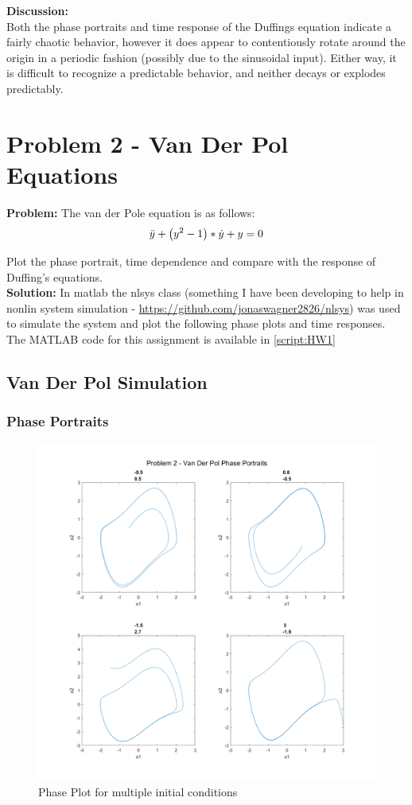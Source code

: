 \documentclass[letter]{article}
\begin{document}
\textbf{Discussion:}\\

Both the phase portraits and time response of the Duffings equation indicate a fairly chaotic behavior, however it does appear to contentiously rotate around the origin in a periodic fashion (possibly due to the sinusoidal input). Either way, it is difficult to recognize a predictable behavior, and neither decays or explodes predictably.


\newpage
\section{Problem 2 - Van Der Pol Equations}
\textbf{Problem:}
The van der Pole equation is as follows:
\begin{displaymath}
	\ddot{y} + \qty(y^2 - 1)*\dot{y} + y = 0
\end{displaymath}

Plot the phase portrait, time dependence and compare with the response of Duffing's equations.\\

\textbf{Solution:}
In matlab the nlsys class (something I have been developing to help in nonlin system simulation - \href{https://github.com/jonaswagner2826/nlsys}{https://github.com/jonaswagner2826/nlsys}) was used to simulate the system and plot the following phase plots and time responses. The MATLAB code for this assignment is available in \appendixname \ref{script:HW1}

\subsection{Van Der Pol Simulation}

\subsubsection{Phase Portraits}

\begin{figure}[h]
	\centering
	\includegraphics[width=0.8\linewidth]{fig/pblm2_phase_comparrision}
	\caption{Phase Plot for multiple initial conditions}
	\label{fig:pblm2phasecomparrision}
\end{figure}
\end{document}
